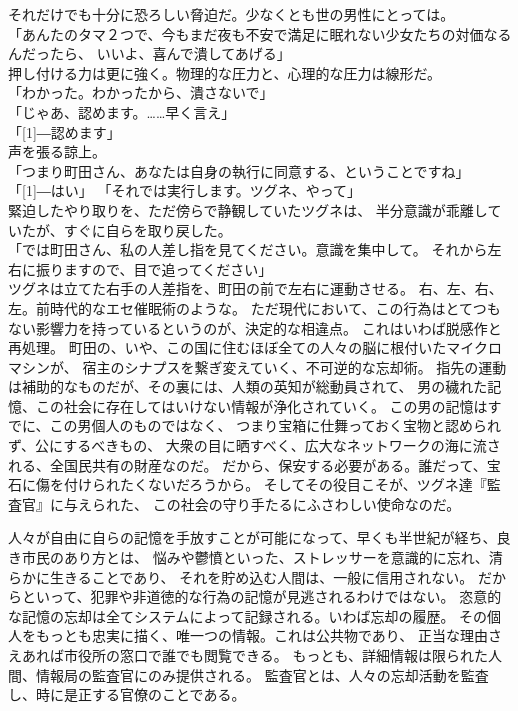 \documentclass[../NenokuniMain]{subfiles}
\begin{document}
それだけでも十分に恐ろしい脅迫だ。少なくとも世の男性にとっては。\\
「あんたのタマ２つで、今もまだ夜も不安で満足に眠れない少女たちの対価なるんだったら、
いいよ、喜んで潰してあげる」\\
押し付ける力は更に強く。物理的な圧力と、心理的な圧力は線形だ。\\
「わかった。わかったから、潰さないで」\\
「じゃあ、認めます。……早く言え」\\
「\scalebox{2}[1]{―}認めます」\\
声を張る諒上。\\
「つまり町田さん、あなたは自身の執行に同意する、ということですね」\\
「\scalebox{2}[1]{―}はい」
「それでは実行します。ツグネ、やって」\\
緊迫したやり取りを、ただ傍らで静観していたツグネは、
半分意識が乖離していたが、すぐに自らを取り戻した。\\
「では町田さん、私の人差し指を見てください。意識を集中して。
それから左右に振りますので、目で追ってください」\\
ツグネは立てた右手の人差指を、町田の前で左右に運動させる。
右、左、右、左。前時代的なエセ催眠術のような。
ただ現代において、この行為はとてつもない影響力を持っているというのが、決定的な相違点。
これはいわば脱感作と再処理。
町田の、いや、この国に住むほぼ全ての人々の脳に根付いたマイクロマシンが、
宿主のシナプスを繋ぎ変えていく、不可逆的な忘却術。
指先の運動は補助的なものだが、その裏には、人類の英知が総動員されて、
男の穢れた記憶、この社会に存在してはいけない情報が浄化されていく。
この男の記憶はすでに、この男個人のものではなく、
つまり宝箱に仕舞っておく宝物と認められず、公にするべきもの、
大衆の目に晒すべく、広大なネットワークの海に流される、全国民共有の財産なのだ。
だから、保安する必要がある。誰だって、宝石に傷を付けられたくないだろうから。
そしてその役目こそが、ツグネ達『監査官』に与えられた、
この社会の守り手たるにふさわしい使命なのだ。

人々が自由に自らの記憶を手放すことが可能になって、早くも半世紀が経ち、良き市民のあり方とは、
悩みや鬱憤といった、ストレッサーを意識的に忘れ、清らかに生きることであり、
それを貯め込む人間は、一般に信用されない。
だからといって、犯罪や非道徳的な行為の記憶が見逃されるわけではない。
恣意的な記憶の忘却は全てシステムによって記録される。いわば忘却の履歴。
その個人をもっとも忠実に描く、唯一つの情報。これは公共物であり、
正当な理由さえあれば市役所の窓口で誰でも閲覧できる。
もっとも、詳細情報は限られた人間、情報局の監査官にのみ提供される。
監査官とは、人々の忘却活動を監査し、時に是正する官僚のことである。
\end{document}
